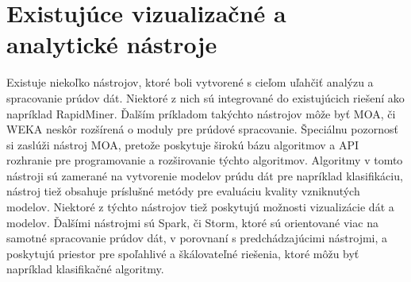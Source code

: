 \chapter{Existujúce vizualizačné a analytické nástroje}
\label{Existujúce vizualizačné a analytické nástroje}
Existuje niekoľko nástrojov, ktoré boli vytvorené s cieľom uľahčiť analýzu a spracovanie prúdov dát. Niektoré z nich sú integrované do existujúcich riešení ako napríklad RapidMiner. Ďalším príkladom takýchto nástrojov môže byť MOA, či WEKA neskôr rozšírená o moduly pre prúdové spracovanie. Špeciálnu pozornosť si zaslúži nástroj MOA, pretože poskytuje širokú bázu algoritmov a API rozhranie pre programovanie a rozširovanie týchto algoritmov. Algoritmy v tomto nástroji sú zamerané na vytvorenie modelov prúdu dát pre napríklad klasifikáciu, nástroj tiež obsahuje príslušné metódy pre evaluáciu kvality vzniknutých modelov. Niektoré z týchto nástrojov tiež poskytujú možnosti vizualizácie dát a modelov. Ďalšími nástrojmi sú Spark, či Storm, ktoré sú orientované viac na samotné spracovanie prúdov dát, v porovnaní s predchádzajúcimi nástrojmi, a poskytujú priestor pre spoľahlivé a škálovateľné riešenia, ktoré môžu byť napríklad klasifikačné algoritmy.


